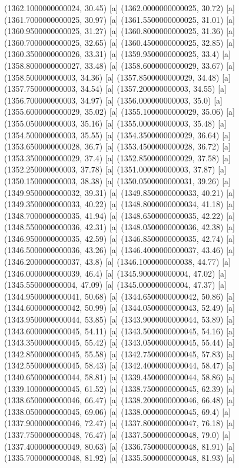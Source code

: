 {{{(1362.1000000000024, 30.45) [a] 
(1362.0000000000025, 30.72) [a] 
(1361.7000000000025, 30.97) [a] 
(1361.5500000000025, 31.01) [a] 
(1360.9500000000025, 31.27) [a] 
(1360.8000000000025, 31.36) [a] 
(1360.7000000000025, 32.65) [a] 
(1360.4500000000025, 32.85) [a] 
(1360.3500000000026, 33.31) [a] 
(1359.9500000000025, 33.4) [a] 
(1358.8000000000027, 33.48) [a] 
(1358.6000000000029, 33.67) [a] 
(1358.500000000003, 34.36) [a] 
(1357.8500000000029, 34.48) [a] 
(1357.750000000003, 34.54) [a] 
(1357.200000000003, 34.55) [a] 
(1356.700000000003, 34.97) [a] 
(1356.000000000003, 35.0) [a] 
(1355.6000000000029, 35.02) [a] 
(1355.1000000000029, 35.06) [a] 
(1355.050000000003, 35.16) [a] 
(1355.000000000003, 35.48) [a] 
(1354.500000000003, 35.55) [a] 
(1354.3500000000029, 36.64) [a] 
(1353.6500000000028, 36.7) [a] 
(1353.4500000000028, 36.72) [a] 
(1353.3500000000029, 37.4) [a] 
(1352.8500000000029, 37.58) [a] 
(1352.250000000003, 37.78) [a] 
(1351.000000000003, 37.87) [a] 
(1350.150000000003, 38.38) [a] 
(1350.0500000000031, 39.26) [a] 
(1349.9500000000032, 39.31) [a] 
(1349.8500000000033, 40.21) [a] 
(1349.3500000000033, 40.22) [a] 
(1348.8000000000034, 41.18) [a] 
(1348.7000000000035, 41.94) [a] 
(1348.6500000000035, 42.22) [a] 
(1348.5500000000036, 42.31) [a] 
(1348.0500000000036, 42.38) [a] 
(1346.9500000000035, 42.59) [a] 
(1346.8500000000035, 42.74) [a] 
(1346.5000000000036, 43.26) [a] 
(1346.4000000000037, 43.46) [a] 
(1346.2000000000037, 43.8) [a] 
(1346.1000000000038, 44.77) [a] 
(1346.0000000000039, 46.4) [a] 
(1345.900000000004, 47.02) [a] 
(1345.550000000004, 47.09) [a] 
(1345.000000000004, 47.37) [a] 
(1344.9500000000041, 50.68) [a] 
(1344.6500000000042, 50.86) [a] 
(1344.6000000000042, 50.99) [a] 
(1344.0500000000043, 52.49) [a] 
(1343.9500000000044, 53.85) [a] 
(1343.9000000000044, 53.89) [a] 
(1343.6000000000045, 54.11) [a] 
(1343.5000000000045, 54.16) [a] 
(1343.3500000000045, 55.42) [a] 
(1343.0500000000045, 55.44) [a] 
(1342.8500000000045, 55.58) [a] 
(1342.7500000000045, 57.83) [a] 
(1342.5500000000045, 58.43) [a] 
(1342.4000000000044, 58.47) [a] 
(1340.6500000000044, 58.81) [a] 
(1339.4500000000044, 58.86) [a] 
(1339.1000000000045, 61.52) [a] 
(1338.7500000000045, 62.39) [a] 
(1338.6500000000046, 66.47) [a] 
(1338.2000000000046, 66.48) [a] 
(1338.0500000000045, 69.06) [a] 
(1338.0000000000045, 69.4) [a] 
(1337.9000000000046, 72.47) [a] 
(1337.8000000000047, 76.18) [a] 
(1337.7500000000048, 76.47) [a] 
(1337.5000000000048, 79.0) [a] 
(1337.4000000000049, 80.63) [a] 
(1336.7500000000048, 81.91) [a] 
(1335.7000000000048, 81.92) [a] 
(1335.5000000000048, 81.93) [a] 
}}}

